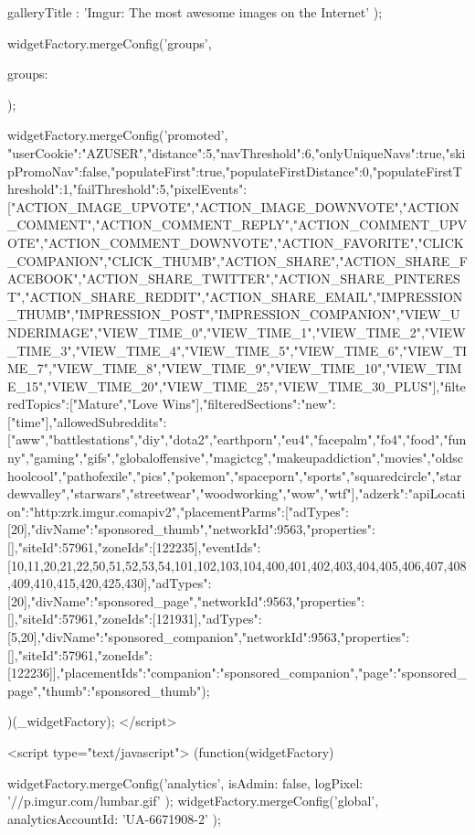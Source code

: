 {{{{        
            galleryTitle        : 'Imgur: The most awesome images on the Internet'
        });

        widgetFactory.mergeConfig('groups', {
            groups: {
                
            }
        });

        widgetFactory.mergeConfig('promoted', {"userCookie":"AZUSER","distance":5,"navThreshold":6,"onlyUniqueNavs":true,"skipPromoNav":false,"populateFirst":true,"populateFirstDistance":0,"populateFirstThreshold":1,"failThreshold":5,"pixelEvents":["ACTION_IMAGE_UPVOTE","ACTION_IMAGE_DOWNVOTE","ACTION_COMMENT","ACTION_COMMENT_REPLY","ACTION_COMMENT_UPVOTE","ACTION_COMMENT_DOWNVOTE","ACTION_FAVORITE","CLICK_COMPANION","CLICK_THUMB","ACTION_SHARE","ACTION_SHARE_FACEBOOK","ACTION_SHARE_TWITTER","ACTION_SHARE_PINTEREST","ACTION_SHARE_REDDIT","ACTION_SHARE_EMAIL","IMPRESSION_THUMB","IMPRESSION_POST","IMPRESSION_COMPANION","VIEW_UNDERIMAGE","VIEW_TIME_0","VIEW_TIME_1","VIEW_TIME_2","VIEW_TIME_3","VIEW_TIME_4","VIEW_TIME_5","VIEW_TIME_6","VIEW_TIME_7","VIEW_TIME_8","VIEW_TIME_9","VIEW_TIME_10","VIEW_TIME_15","VIEW_TIME_20","VIEW_TIME_25","VIEW_TIME_30_PLUS"],"filteredTopics":["Mature","Love Wins"],"filteredSections":{"new":["time"]},"allowedSubreddits":["aww","battlestations","diy","dota2","earthporn","eu4","facepalm","fo4","food","funny","gaming","gifs","globaloffensive","magictcg","makeupaddiction","movies","oldschoolcool","pathofexile","pics","pokemon","spaceporn","sports","squaredcircle","stardewvalley","starwars","streetwear","woodworking","wow","wtf"],"adzerk":{"apiLocation":"http:\/\/zrk.imgur.com\/api\/v2","placementParms":[{"adTypes":[20],"divName":"sponsored_thumb","networkId":9563,"properties":[],"siteId":57961,"zoneIds":[122235],"eventIds":[10,11,20,21,22,50,51,52,53,54,101,102,103,104,400,401,402,403,404,405,406,407,408,409,410,415,420,425,430]},{"adTypes":[20],"divName":"sponsored_page","networkId":9563,"properties":[],"siteId":57961,"zoneIds":[121931]},{"adTypes":[5,20],"divName":"sponsored_companion","networkId":9563,"properties":[],"siteId":57961,"zoneIds":[122236]}],"placementIds":{"companion":"sponsored_companion","page":"sponsored_page","thumb":"sponsored_thumb"}}});
    })(_widgetFactory);
    </script>

            <script type="text/javascript">
            (function(widgetFactory) {
                widgetFactory.mergeConfig('analytics', {
                    isAdmin: false,
                    logPixel: '//p.imgur.com/lumbar.gif'
                });
                widgetFactory.mergeConfig('global', {
                    analyticsAccountId: 'UA-6671908-2'
                });

}}}
